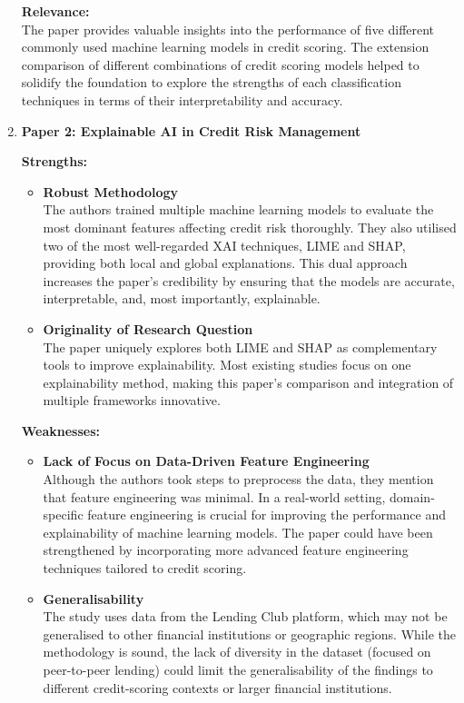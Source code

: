 \documentclass[12pt,a4paper]{article}
\begin{document}
\begin{enumerate}
    \textbf{Relevance:}\\
    The paper provides valuable insights into the performance of five different commonly used machine learning models in credit scoring. The extension comparison of different combinations of credit scoring models helped to solidify the foundation to explore the strengths of each classification techniques in terms of their interpretability and accuracy. 

    \vspace{0.2cm}

    \item \textbf{Paper 2: Explainable AI in Credit Risk Management} 

    \textbf{Strengths:}\\
    \vspace{-2em}
    \begin{itemize}
        \item \textbf{Robust Methodology}\\
        The authors trained multiple machine learning models to evaluate the most dominant features affecting credit risk thoroughly. They also utilised two of the most well-regarded XAI techniques, LIME and SHAP, providing both local and global explanations. This dual approach increases the paper’s credibility by ensuring that the models are accurate, interpretable, and, most importantly, explainable. 
        \item \textbf{Originality of Research Question}\\
        The paper uniquely explores both LIME and SHAP as complementary tools to improve explainability. Most existing studies focus on one explainability method, making this paper's comparison and integration of multiple frameworks innovative.
    \end{itemize}

    \textbf{Weaknesses:}\\
    \vspace{-2em}
    \begin{itemize}
        \item \textbf{Lack of Focus on Data-Driven Feature Engineering}\\
        Although the authors took steps to preprocess the data, they mention that feature engineering was minimal. In a real-world setting, domain-specific feature engineering is crucial for improving the performance and explainability of machine learning models. The paper could have been strengthened by incorporating more advanced feature engineering techniques tailored to credit scoring.
        \item \textbf{Generalisability}\\
        The study uses data from the Lending Club platform, which may not be generalised to other financial institutions or geographic regions. While the methodology is sound, the lack of diversity in the dataset (focused on peer-to-peer lending) could limit the generalisability of the findings to different credit-scoring contexts or larger financial institutions.
    \end{itemize}


\end{enumerate}
\end{document}
